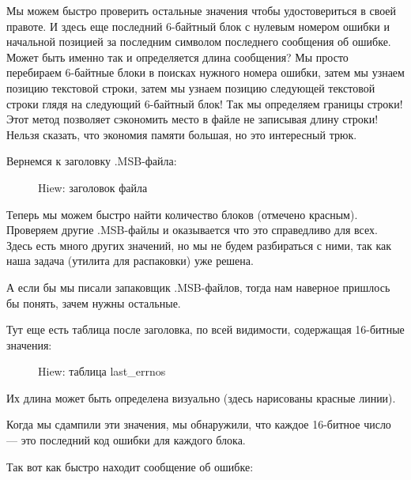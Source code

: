 Мы можем быстро проверить остальные значения чтобы удостовериться в своей правоте.
И здесь еще последний  6-байтный блок с нулевым номером ошибки и начальной позицией за последним
символом последнего сообщения об ошибке.
Может быть именно так и определяется длина сообщения?
Мы просто перебираем 6-байтные блоки в поисках нужного номера ошибки, затем
мы узнаем позицию текстовой строки, затем мы узнаем позицию следующей текстовой строки глядя на
следующий 6-байтный блок!
Так мы определяем границы строки!
Этот метод позволяет сэкономить место в файле не записывая длину строки!
Нельзя сказать, что экономия памяти большая, но это интересный трюк.

\clearpage
Вернемся к заголовку .MSB-файла:

\begin{figure}[H]
\centering
{}
\caption{Hiew: заголовок файла}
\label{fig:oracle_MSB_3}
\end{figure}

Теперь мы можем быстро найти количество блоков (отмечено красным).
Проверяем другие .MSB-файлы и оказывается что это справедливо для всех.
Здесь есть много других значений, но мы не будем разбираться с ними, так как наша задача (утилита для распаковки) уже решена.

А если бы мы писали запаковщик .MSB-файлов, тогда нам наверное пришлось бы понять, зачем нужны остальные.

\clearpage
Тут еще есть таблица после заголовка, по всей видимости, содержащая 16-битные значения:

\begin{figure}[H]
\centering
{}
\caption{Hiew: таблица last\_errnos}
\label{fig:oracle_MSB_4}
\end{figure}

Их длина может быть определена визуально (здесь нарисованы красные линии).

Когда мы сдампили эти значения, мы обнаружили, что каждое 16-битное число --- это последний код ошибки для каждого блока.%

Так вот как \oracle быстро находит сообщение об ошибке:

